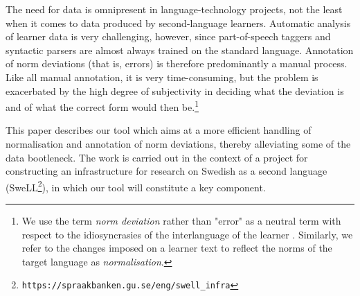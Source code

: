 \documentclass[10pt, a4paper]{article}
\newcommand{\normAnn}[0]{our tool }
\begin{document}
The need for data is omnipresent in language-technology projects, not the least when it comes to data produced by second-language learners.
Automatic analysis of learner data is very challenging, however, since part-of-speech taggers and syntactic parsers are almost always trained on the standard language. Annotation of norm deviations (that is, errors) is therefore predominantly a manual process. Like all manual annotation, it is very time-consuming, but the problem is exacerbated by the high degree of subjectivity in deciding what the deviation is and of what the correct form would then be.\footnote{We use the term {\em norm deviation} rather than "error" as a neutral term with respect to the idiosyncrasies of the interlanguage of the learner \cite{Selinker1972}. Similarly, we refer to the changes imposed on a learner text to reflect the norms of the target language as {\em normalisation}. }

This paper describes %
\normAnn which aims at a more efficient handling of normalisation and annotation of norm deviations, thereby alleviating some of the data bootleneck. The work is carried out in the context of a project for constructing an infrastructure for research on Swedish as a second language (SweLL\footnote{%
{\tt https://spraakbanken.gu.se/eng/swell\_infra}}), in which \normAnn will constitute a key component.


\end{document}
